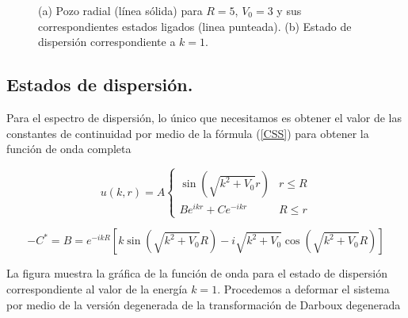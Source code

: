 \begin{figure}
	\centering
	\hfill%
	\caption{\label{TRPR-Figure} (a) Pozo radial (línea sólida) para $R=5$, $V_0=3$ y sus correspondientes estados ligados (linea punteada). (b) Estado de dispersión correspondiente a $k=1$.}
\end{figure}

\subsection{Estados de dispersión.}

Para el espectro de dispersión, lo único que necesitamos es obtener el valor de las constantes de continuidad por medio de la fórmula (\ref{CSS}) para obtener la función de onda completa

\begin{equation*}
	u(k,r)=
	A
	\begin{cases}
	\sin(\sqrt{k^2 + V_0}r) & r \le R
	\\
	B e^{i k r} + C e^{- i k r} & R \le r
	\end{cases}
\end{equation*}

\begin{equation*}
	-C^{*}=B = e^{-i k R}[k \sin(\sqrt{k^2 + V_0}R)-i \sqrt{k^2 + V_0} \cos(\sqrt{k^2 + V_0} R)]
\end{equation*}

La figura \label{TRPR-Figure} muestra la gráfica de la función de onda para el estado de dispersión correspondiente al valor de la energía $k=1$. Procedemos a deformar el sistema por medio de la versión degenerada de la transformación de Darboux degenerada

